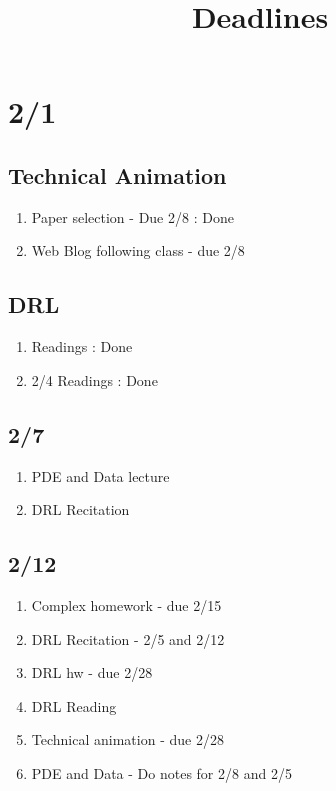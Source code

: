 \documentclass[11pt]{article}
\title{Deadlines}
\theoremstyle{remark}
\begin{document}
\maketitle

\section{2/1}

\subsection{Technical Animation}

\begin{enumerate}
	\item Paper selection - Due 2/8 : Done
	\item Web Blog following class - due 2/8
\end{enumerate}

\subsection{DRL}

\begin{enumerate}
	\item Readings : Done
	\item 2/4 Readings : Done
\end{enumerate}


\subsection{2/7}

\begin{enumerate}
	\item PDE and Data lecture
	\item DRL Recitation
\end{enumerate}

\subsection{2/12}

\begin{enumerate}
	\item Complex homework - due 2/15
	\item DRL Recitation - 2/5 and 2/12
	\item DRL hw - due 2/28
	\item DRL Reading
	\item Technical animation - due 2/28
	\item PDE and Data - Do notes for 2/8 and 2/5
\end{enumerate}
\end{document}
